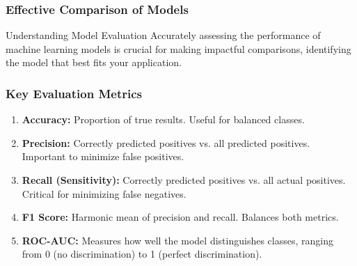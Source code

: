 \documentclass[aspectratio=169]{beamer}
\begin{document}
\begin{frame}[fragile]
    \frametitle{Effective Comparison of Models}
    \begin{block}{Understanding Model Evaluation}
        Accurately assessing the performance of machine learning models is crucial for making impactful comparisons, identifying the model that best fits your application.
    \end{block}
\end{frame}

\begin{frame}[fragile]
    \frametitle{Key Evaluation Metrics}
    \begin{enumerate}
        \item \textbf{Accuracy:} Proportion of true results. Useful for balanced classes.
        \item \textbf{Precision:} Correctly predicted positives vs. all predicted positives. Important to minimize false positives.
        \item \textbf{Recall (Sensitivity):} Correctly predicted positives vs. all actual positives. Critical for minimizing false negatives.
        \item \textbf{F1 Score:} Harmonic mean of precision and recall. Balances both metrics.
        \item \textbf{ROC-AUC:} Measures how well the model distinguishes classes, ranging from 0 (no discrimination) to 1 (perfect discrimination).
    \end{enumerate}
\end{frame}
\end{document}
